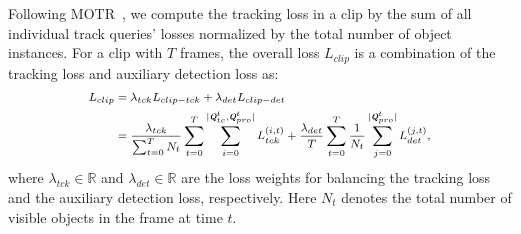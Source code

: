 

Following MOTR~\cite{zeng2021motr}, we compute the tracking loss in a clip by the sum of all individual track queries' losses normalized by the total number of object instances.
For a clip with $T$ frames, the overall loss $L_{clip}$ is a combination of the tracking loss and auxiliary detection loss as:
%
\begin{equation}
    \footnotesize
    \begin{split}
    L_{clip} &= \lambda_{tck}L_{clip-tck}+\lambda_{det}L_{clip-det} \\
    &=\frac{\lambda_{tck}}{\sum_{t=0}^{T} N_t}\sum_{t=0}^T\sum_{i=0}^{|\textbf{\em Q}^t_{tc}, \textbf{\em Q}^t_{pro}|}{L_{tck}^{(i, t)}}+\frac{\lambda_{det}}{T}\sum^T_{t=0}\frac{1}{N_t}\sum_{j=0}^{|\textbf{\em Q}^t_{pro}|}L_{det}^{(j, t)},
    \end{split}
    \label{eq:cliploss}
\end{equation}
%
where $\lambda_{tck} \in \mathbb{R}$ and $\lambda_{det} \in \mathbb{R}$ are the loss weights for balancing the tracking loss and the auxiliary detection loss, respectively. 
Here $N_t$ denotes the total number of visible objects in the frame at time $t$.

